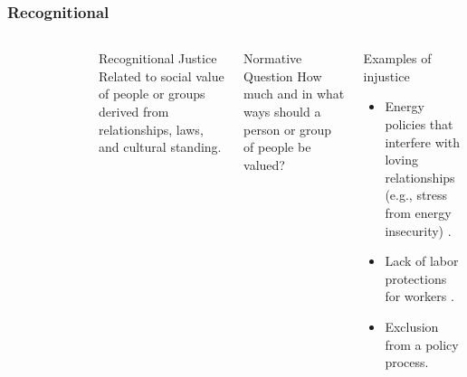 \begin{frame}
    \frametitle{Recognitional}
    \begin{columns}
        \column[t]{3cm}
        \begin{figure}
            \centering
        \end{figure}
        \column[t]{7cm}
        \begin{block}{Recognitional Justice}
            Related to social value of people or groups derived from
            relationships, laws, and cultural standing.
        \end{block}
        \begin{block}{Normative Question}
            How much and in what ways should a person or group of people be
            valued?
        \end{block}
        \begin{block}{Examples of injustice}
            \begin{itemize}
                \item Energy policies that interfere with loving relationships
                (e.g., stress from energy
                insecurity) \cite{van_uffelen_revisiting_2022}.
                \item Lack of labor protections for
                workers \cite{van_uffelen_revisiting_2022}.
                \item Exclusion from a policy process\cite{van_uffelen_revisiting_2022}.
            \end{itemize}
        \end{block}
    \end{columns}
    
\end{frame}

